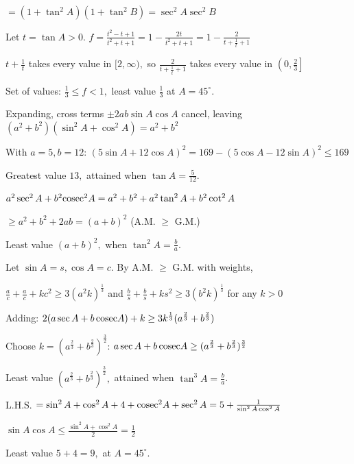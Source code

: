     $= (1 + \tan^2 A)(1 + \tan^2 B) = \sec^2 A\sec^2 B$

\item Let $t = \tan A > 0$. $f = \frac{t^2 - t + 1}{t^2 + t + 1} = 1 - \frac{2t}{t^2 + t + 1} = 1 - \frac{2}{t + \frac{1}{t} + 1}$

    $t + \frac{1}{t}$ takes every value in $[2, \infty),$ so $\frac{2}{t + \frac{1}{t} + 1}$ takes every value in $\left(0,
    \frac{2}{3}\right]$

    Set of values: $\frac{1}{3} \leq f < 1,$ least value $\frac{1}{3}$ at $A = 45^\circ$.

\item Expanding, cross terms $\pm 2ab\sin A\cos A$ cancel, leaving $(a^2 + b^2)(\sin^2 A + \cos^2 A) = a^2 + b^2$

    With $a = 5, b = 12$: $(5\sin A + 12\cos A)^2 = 169 - (5\cos A - 12\sin A)^2 \leq 169$

    Greatest value $13,$ attained when $\tan A = \frac{5}{12}$.

\item $a^2\sec^2 A + b^2{\rm cosec}^2 A = a^2 + b^2 + a^2\tan^2 A + b^2\cot^2 A$

    $\geq a^2 + b^2 + 2ab = (a + b)^2$ (A.M. $\geq$ G.M.)

    Least value $(a + b)^2,$ when $\tan^2 A = \frac{b}{a}$.

\item Let $\sin A = s, \cos A = c$. By A.M. $\geq$ G.M. with weights,

    $\frac{a}{c} + \frac{a}{c} + k c^2 \geq 3(a^2k)^{\frac{1}{3}}$ and $\frac{b}{s} + \frac{b}{s} + k s^2 \geq 3(b^2k)^{\frac{1}{3}}$
    for any $k > 0$

    Adding: $2(a\sec A + b\,{\rm cosec} A) + k \geq 3k^{\frac{1}{3}}(a^{\frac{2}{3}} + b^{\frac{2}{3}})$

    Choose $k = (a^{\frac{2}{3}} + b^{\frac{2}{3}})^{\frac{3}{2}}$: $a\sec A + b\,{\rm cosec} A \geq (a^{\frac{2}{3}} +
    b^{\frac{2}{3}})^{\frac{3}{2}}$

    Least value $(a^{\frac{2}{3}} + b^{\frac{2}{3}})^{\frac{3}{2}},$ attained when $\tan^3 A = \frac{b}{a}$.

\item L.H.S. $= \sin^2 A + \cos^2 A + 4 + {\rm cosec}^2 A + \sec^2 A = 5 + \frac{1}{\sin^2 A\cos^2 A}$

    $\sin A\cos A \leq \frac{\sin^2 A + \cos^2 A}{2} = \frac{1}{2}$

    Least value $5 + 4 = 9,$ at $A = 45^\circ$.

